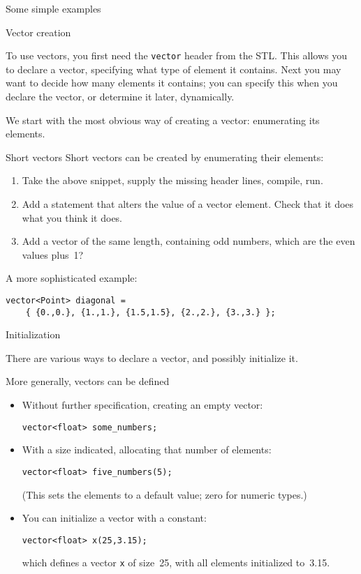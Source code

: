  {Some simple examples}

 {Vector creation}

To use vectors, you first need the \lstinline{vector} header from the \ac{STL}.
This allows you to declare a vector, specifying what type of element
it contains. Next you may want to decide how many elements it
contains; you can specify this when you declare the vector, or
determine it later, dynamically.

We start with the most obvious way of creating a vector:
enumerating its elements.

\begin{block}{Short vectors}
  \label{sl:vectorshort}
  Short vectors can be created by enumerating their elements:
\end{block}

\begin{exercise}
  \label{ex:shortvectoralter}
  \begin{enumerate}
  \item
    Take the above snippet, supply the missing header lines, compile, run.
  \item Add a statement that alters the value of a vector element.
    Check that it does what you think it does.
  \item Add a vector of the same length, containing odd numbers,
    which are the even values plus~1?
  \end{enumerate}
\end{exercise}

A more sophisticated example:
\begin{lstlisting}
vector<Point> diagonal = 
    { {0.,0.}, {1.,1.}, {1.5,1.5}, {2.,2.}, {3.,3.} };
\end{lstlisting}

 {Initialization}

There are various ways to declare a vector, and possibly initialize it.

More generally, vectors can be defined
\begin{itemize}
\item Without further specification, creating an empty vector:
\begin{lstlisting}
vector<float> some_numbers;
\end{lstlisting}
\item With a size indicated, allocating that number of elements:
\begin{lstlisting}
vector<float> five_numbers(5);
\end{lstlisting}
(This sets the elements to a default value; zero for numeric types.)
\item You can initialize a vector with a constant:
\begin{lstlisting}
vector<float> x(25,3.15);
\end{lstlisting}
which defines a vector \lstinline{x} of size~25,
with all elements initialized to~3.15.
\end{itemize}

